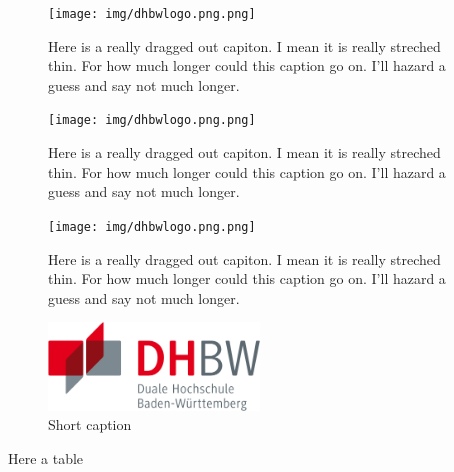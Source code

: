\captionsetup[figure]{justification=justified, format=plain}

\begin{figure}[htbp!]
    \centering
    \texttt{[image: img/dhbwlogo.png.png]}
    \caption{Here is a really dragged out capiton. I mean it is really streched thin. For how much longer could this caption go on. I'll hazard a guess and say not much longer.}
    \label{fig6}
\end{figure}

\captionsetup[figure]{justification=justified, format=plain, labelsep=quad}

\begin{figure}[htbp!]
    \centering
    \texttt{[image: img/dhbwlogo.png.png]}
    \caption{Here is a really dragged out capiton. I mean it is really streched thin. For how much longer could this caption go on. I'll hazard a guess and say not much longer.}
    \label{fig7}
\end{figure}

\captionsetup[figure]{format=hang, justification=justified, format=plain, labelsep=quad, labelfont = bf}

\begin{figure}[htbp!]
    \centering
    \texttt{[image: img/dhbwlogo.png.png]}
    \caption{Here is a really dragged out capiton. I mean it is really streched thin. For how much longer could this caption go on. I'll hazard a guess and say not much longer.}
    \label{fig8}
\end{figure}

\cleardoublepage

\begin{figure}[htbp!]
    \centering
    \includegraphics[width=0.5\textwidth]{img/dhbwlogo.png}
    \caption{Short caption}
    \label{fig9}
\end{figure}

Here a table

